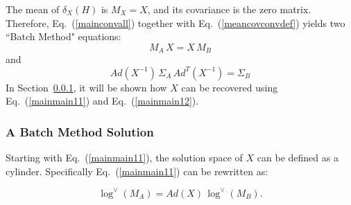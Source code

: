 \documentclass[twocolumn,10pt]{asme2ej}
\begin{document}
The mean of $\delta_X(H)$ is $M_X = X$, and its covariance is the zero matrix.
Therefore, Eq.~(\ref{mainconvall}) together with Eq.~(\ref{meancovconvdef}) yields two ``Batch Method" equations:
\begin{equation}
\boxed{\,
M_A \, X = X \, M_B
\,}
\label{mainmain11} \end{equation}
and
\begin{equation}
\boxed{\,
Ad(X^{-1}) \, \Sigma_{A} \, Ad^T(X^{-1}) = \Sigma_{B}
\,}
\label{mainmain12} \end{equation}
In Section~\ref{sec:batch_meth_sol}, it will be shown how $X$ can be recovered using Eq.~(\ref{mainmain11}) and Eq.~(\ref{mainmain12}).

\subsubsection{A Batch Method Solution}
\label{sec:batch_meth_sol}
Starting with Eq.~(\ref{mainmain11}), the solution space of $X$ can be defined as a cylinder. Specifically Eq.~(\ref{mainmain11}) can be rewritten as:

\begin{equation}
\log^{\vee}(M_A)  = Ad(X) \,\log^{\vee}(M_B).
\label{mainmain1rewrite} \end{equation}
\end{document}

